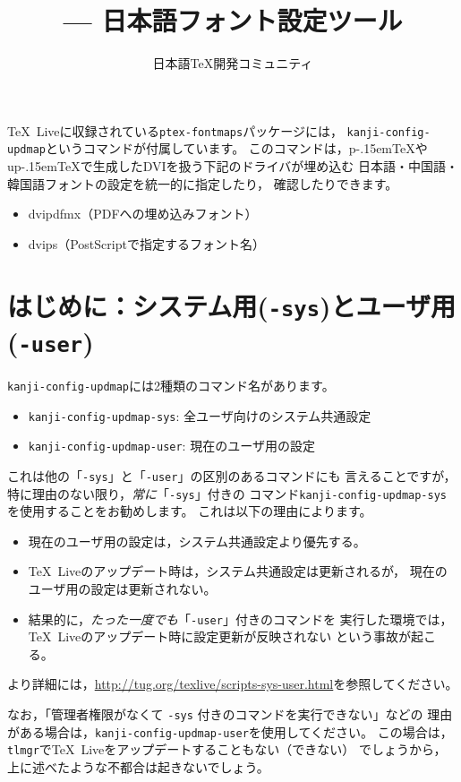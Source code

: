 \documentclass{jlreq}
\title{\command{kanji-config-updmap} --- 日本語フォント設定ツール}
\author{日本語\TeX 開発コミュニティ}
\def\file#1{\texttt{#1}}
\def\command#1{\texttt{#1}}
\def\TL{\TeX~Live}
\def\pTeX{p\kern-.15em\TeX}
\def\upTeX{u\pTeX}
\begin{document}
\maketitle

\TL に収録されている\file{ptex-fontmaps}パッケージには，
\command{kanji-config-updmap}というコマンドが付属しています。
このコマンドは，\pTeX や\upTeX で生成したDVIを扱う下記のドライバが埋め込む
日本語・中国語・韓国語フォントの設定を統一的に指定したり，
確認したりできます。
\begin{itemize}
  \item dvipdfmx（PDFへの埋め込みフォント）
  \item dvips（PostScriptで指定するフォント名）
\end{itemize}

\section{はじめに：システム用(\command{-sys})とユーザ用(\command{-user})}

\command{kanji-config-updmap}には2種類のコマンド名があります。
\begin{itemize}
  \item \command{kanji-config-updmap-sys}: 全ユーザ向けのシステム共通設定
  \item \command{kanji-config-updmap-user}: 現在のユーザ用の設定
\end{itemize}
これは他の「\command{-sys}」と「\command{-user}」の区別のあるコマンドにも
言えることですが，特に理由のない限り，\emph{常に}「\command{-sys}」付きの
コマンド\command{kanji-config-updmap-sys}を使用することをお勧めします。
これは以下の理由によります。
\begin{itemize}
  \item 現在のユーザ用の設定は，システム共通設定より優先する。
  \item \TL のアップデート時は，システム共通設定は更新されるが，
        現在のユーザ用の設定は更新されない。
  \item 結果的に，\emph{たった一度でも}「\command{-user}」付きのコマンドを
        実行した環境では，\TL のアップデート時に設定更新が反映されない
        という事故が起こる。
\end{itemize}
より詳細には，\url{http://tug.org/texlive/scripts-sys-user.html}を参照してください。

なお，「管理者権限がなくて \command{-sys} 付きのコマンドを実行できない」などの
理由がある場合は，\command{kanji-config-updmap-user}を使用してください。
この場合は，\command{tlmgr}で\TL をアップデートすることもない（できない）
でしょうから，上に述べたような不都合は起きないでしょう。
\end{document}
